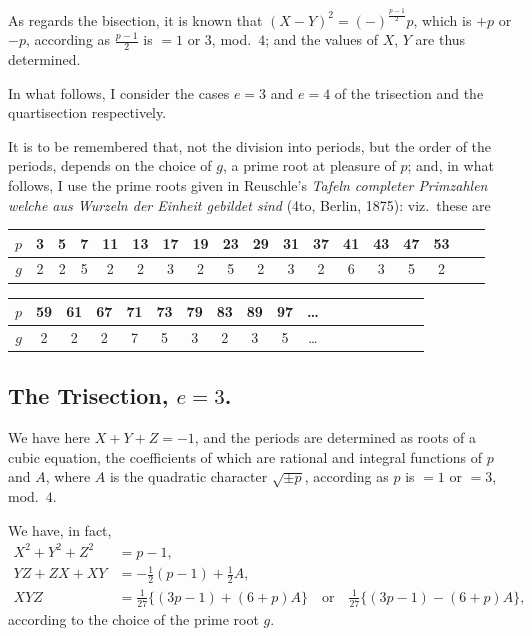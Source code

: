 \documentclass[12pt,a4paper]{article}
\theoremstyle{plain}
\begin{document}
As regards the bisection, it is known that $(X-Y)^2 = (-)^{\frac{p-1}{2}}p$,
which is $+p$ or $-p$, according as $\frac{p-1}{2}$ is $=1$ or $3$, mod.~$4$;
and the values of $X$, $Y$ are thus determined.

In what follows, I consider the cases $e=3$ and $e=4$ of the
trisection and the quartisection respectively.

It is to be remembered that, not the division into periods, but the
order of the periods, depends on the choice of $g$, a prime root at
pleasure of $p$; and, in what follows, I use the prime roots given in
Reuschle's \textit{Tafeln completer Primzahlen welche aus Wurzeln der Einheit
gebildet sind} (4to, Berlin, 1875): viz.~these are

\begin{center}
\begin{tabular}{c|ccccccccccccccccc}
\toprule
$p$ & 3 & 5 & 7 & 11 & 13 & 17 & 19 & 23 & 29 & 31 & 37 & 41 & 43 & 47 & 53 \\
\midrule
$g$ & 2 & 2 & 5 & 2 & 2 & 3 & 2 & 5 & 2 & 3 & 2 & 6 & 3 & 5 & 2 \\
\bottomrule
\end{tabular}
\end{center}

\begin{center}
\begin{tabular}{c|ccccccccccccccccc}
\toprule
$p$ & 59 & 61 & 67 & 71 & 73 & 79 & 83 & 89 & 97 & \dots \\
\midrule
$g$ & 2 & 2 & 2 & 7 & 5 & 3 & 2 & 3 & 5 & \dots \\
\bottomrule
\end{tabular}
\end{center}

\subsection*{The Trisection, $e=3$.}

We have here $X+Y+Z=-1$, and the periods are determined as
roots of a cubic equation, the coefficients of which are rational and
integral functions of $p$ and $A$, where $A$ is the quadratic character
$\sqrt{\pm p}$, according as $p$ is $=1$ or $=3$, mod.~$4$.

We have, in fact,
\begin{align*}
X^2 + Y^2 + Z^2 &= p-1,\\
YZ + ZX + XY &= -\tfrac{1}{2}(p-1) + \tfrac{1}{2}A,\\
XYZ &= \tfrac{1}{27}\{(3p-1) + (6+p)A\} \quad\text{or}\quad
      \tfrac{1}{27}\{(3p-1) - (6+p)A\},
\end{align*}
according to the choice of the prime root $g$.
\end{document}
